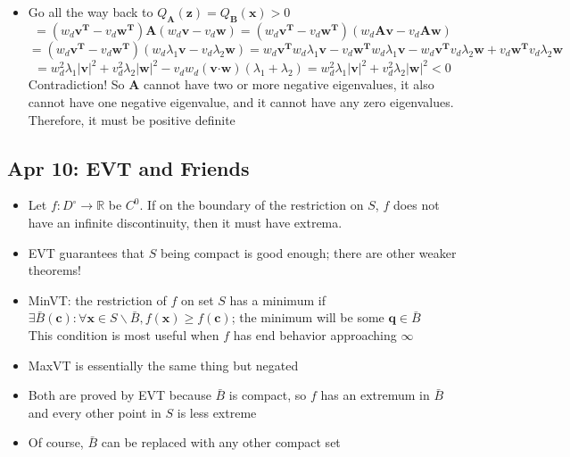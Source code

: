 \documentclass[10pt, oneside]{article}
\let\geq\geqslant
\newcommand{\R}{\mathbb{R}}
\newcommand{\Cdot}{\boldsymbol{\cdot}}
\renewcommand{\vec}[1]{\mathbf{#1}}
\newcommand{\mat}[1]{\mathbf{#1}}
\begin{document}
\begin{itemize}
    \item Go all the way back to $Q_\mat{A} (\vec{z}) = Q_\mat{B}(\vec{x}) > 0$
            \[= (w_d\vec{v^T} - v_d\vec{w^T})\mat{A}(w_d\vec{v} - v_d\vec{w}) = (w_d\vec{v^T} - v_d\vec{w^T})(w_d\mat{A}\vec{v} - v_d\mat{A}\vec{w})\]
            \[= (w_d\vec{v^T} - v_d\vec{w^T})(w_d\lambda_1\vec{v} - v_d\lambda_2\vec{w}) = w_d\vec{v^T}w_d\lambda_1\vec{v} - v_d\vec{w^T}w_d\lambda_1\vec{v} - w_d\vec{v^T}v_d\lambda_2\vec{w} + v_d\vec{w^T}v_d\lambda_2\vec{w}\]
            \[= w_d^2 \lambda_1 |\vec{v}|^2 + v_d^2 \lambda_2 |\vec{w}|^2 - v_dw_d(\vec{v} \Cdot \vec{w})(\lambda_1 + \lambda_2) = w_d^2 \lambda_1 |\vec{v}|^2 + v_d^2 \lambda_2 |\vec{w}|^2 < 0\]
        Contradiction! So $\mat{A}$ cannot have two or more negative eigenvalues, it also cannot have one negative eigenvalue, and it cannot have any zero eigenvalues. Therefore, it must be positive definite
\end{itemize}


\subsection{Apr 10: EVT and Friends}
\begin{itemize}
    \item  Let $f: D^\circ \rightarrow \R$ be $C^0$. If on the boundary of the restriction on $S$, $f$ does not have an infinite discontinuity, then it must have extrema. 
    \item EVT guarantees that $S$ being compact is good enough; there are other weaker theorems!
    \item MinVT: the restriction of $f$ on set $S$ has a minimum if $\exists \bar{B}(\vec{c}) : \forall \vec{x} \in S \backslash \bar{B}, f(\vec{x}) \geq f(\vec{c})$; the minimum will be some $\vec{q} \in \bar{B}$\\
    This condition is most useful when $f$ has end behavior approaching $\infty$
    \item MaxVT is essentially the same thing but negated
    \item Both are proved by EVT because $\bar{B}$ is compact, so $f$ has an extremum in  $\bar{B}$ and every other point in $S$ is less extreme
    \item Of course, $\bar{B}$ can be replaced with any other compact set
\end{itemize}
\end{document}
